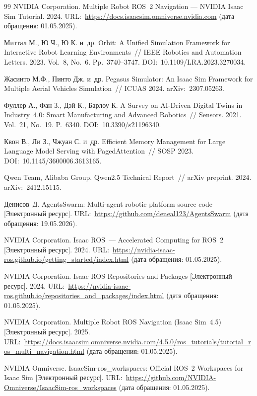 \documentclass[14pt,a4paper]{extreport}
\begin{document}
\begin{thebibliography}{99}
NVIDIA Corporation. Multiple Robot ROS~2 Navigation --- NVIDIA Isaac Sim Tutorial. 2024. URL:~\url{https://docs.isaacsim.omniverse.nvidia.com} (дата обращения: 01.05.2025).

Миттал М., Ю Ч., Ю К. и~др. Orbit: A Unified Simulation Framework for Interactive Robot Learning Environments~// IEEE Robotics and Automation Letters. 2023. Vol.~8, No.~6. Pp.~3740--3747. DOI:~10.1109/LRA.2023.3270034.

Жасинто М.Ф., Пинто Дж. и~др. Pegasus Simulator: An Isaac Sim Framework for Multiple Aerial Vehicles Simulation~// ICUAS 2024. arXiv:~2307.05263.

Фуллер А., Фан З., Дэй К., Барлоу К. A Survey on AI-Driven Digital Twins in Industry~4.0: Smart Manufacturing and Advanced Robotics~// Sensors. 2021. Vol.~21, No.~19. P.~6340. DOI:~10.3390/s21196340.

Квон В., Ли З., Чжуан С. и~др. Efficient Memory Management for Large Language Model Serving with PagedAttention~// SOSP 2023. DOI:~10.1145/3600006.3613165.

Qwen Team, Alibaba Group. Qwen2.5 Technical Report~// arXiv preprint. 2024. arXiv:~2412.15115.

Денисов~Д. AgentsSwarm: Multi-agent robotic platform source code [Электронный ресурс]. URL:~\url{https://github.com/deneal123/AgentsSwarm} (дата обращения: 19.05.2026).

NVIDIA Corporation. Isaac ROS~--- Accelerated Computing for ROS~2 [Электронный ресурс]. 2024. URL:~\url{https://nvidia-isaac-ros.github.io/getting_started/index.html} (дата обращения: 01.05.2025).

NVIDIA Corporation. Isaac ROS Repositories and Packages [Электронный ресурс]. 2024. URL:~\url{https://nvidia-isaac-ros.github.io/repositories_and_packages/index.html} (дата обращения: 01.05.2025).

NVIDIA Corporation. Multiple Robot ROS Navigation (Isaac Sim~4.5) [Электронный ресурс]. 2025. URL:~\url{https://docs.isaacsim.omniverse.nvidia.com/4.5.0/ros_tutorials/tutorial_ros_multi_navigation.html} (дата обращения: 01.05.2025).

NVIDIA Omniverse. IsaacSim-ros\_workspaces: Official ROS~2 Workspaces for Isaac Sim [Электронный ресурс]. URL:~\url{https://github.com/NVIDIA-Omniverse/IsaacSim-ros_workspaces} (дата обращения: 01.05.2025).


\end{thebibliography}
\end{document}
